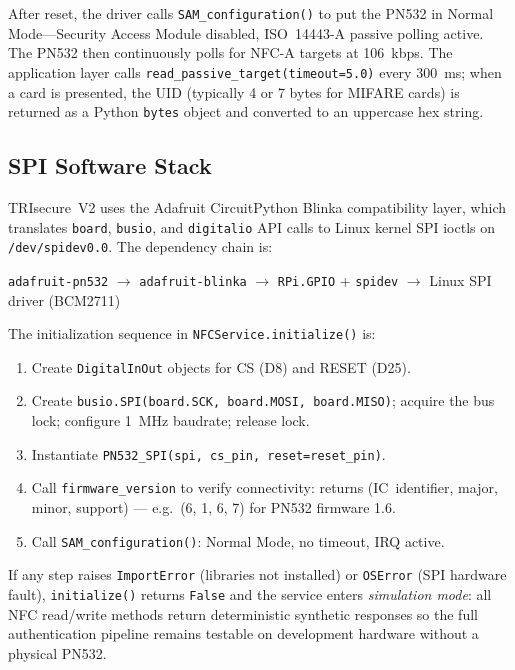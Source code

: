 \documentclass[pdflatex,sn-vancouver-num]{sn-jnl}%
\theoremstyle{thmstyleone}%
\theoremstyle{thmstyletwo}%
\theoremstyle{thmstylethree}%
\begin{document}
After reset, the driver calls \texttt{SAM\_configuration()} to put the PN532
in Normal Mode---Security Access Module disabled, ISO~14443-A passive polling
active. The PN532 then continuously polls for NFC-A targets at 106~kbps. The
application layer calls \texttt{read\_passive\_target(timeout=5.0)} every
300~ms; when a card is presented, the UID (typically 4 or 7 bytes for MIFARE
cards) is returned as a Python \texttt{bytes} object and converted to an
uppercase hex string.

\subsection{SPI Software Stack}

TRIsecure~V2 uses the Adafruit CircuitPython Blinka compatibility layer, which
translates \texttt{board}, \texttt{busio}, and \texttt{digitalio} API calls to
Linux kernel SPI ioctls on \texttt{/dev/spidev0.0}. The dependency chain is:

\medskip
\noindent
\texttt{adafruit-pn532} $\to$ \texttt{adafruit-blinka} $\to$
\texttt{RPi.GPIO} + \texttt{spidev} $\to$ Linux SPI driver (BCM2711)
\medskip

\noindent The initialization sequence in \texttt{NFCService.initialize()} is:
\begin{enumerate}[label=\arabic*.,leftmargin=*,nosep]
  \item Create \texttt{DigitalInOut} objects for CS (D8) and RESET (D25).
  \item Create \texttt{busio.SPI(board.SCK, board.MOSI, board.MISO)};
        acquire the bus lock; configure 1~MHz baudrate; release lock.
  \item Instantiate \texttt{PN532\_SPI(spi, cs\_pin, reset=reset\_pin)}.
  \item Call \texttt{firmware\_version} to verify connectivity: returns
        (IC~identifier, major, minor, support) --- e.g.\ (6, 1, 6, 7)
        for PN532 firmware 1.6.
  \item Call \texttt{SAM\_configuration()}: Normal Mode, no timeout, IRQ
        active.
\end{enumerate}

If any step raises \texttt{ImportError} (libraries not installed) or
\texttt{OSError} (SPI hardware fault), \texttt{initialize()} returns
\texttt{False} and the service enters \emph{simulation mode}: all NFC
read/write methods return deterministic synthetic responses so the full
authentication pipeline remains testable on development hardware without a
physical PN532.
\end{document}
